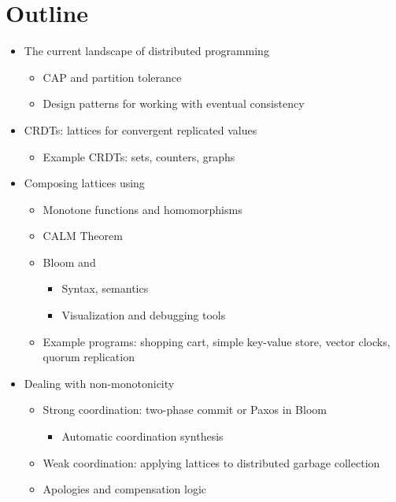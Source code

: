 \section{Outline}

\begin{itemize}
\item
  The current landscape of distributed programming
  \begin{itemize}
  \item
    CAP and partition tolerance~\cite{Brewer2012,Brewer2000}
  \item
    Design patterns for working with eventual consistency
  \end{itemize}
\item
  CRDTs: lattices for convergent replicated values
  \begin{itemize}
  \item
    Example CRDTs: sets, counters, graphs
  \end{itemize}
\item
  Composing lattices using \blooml
  \begin{itemize}
  \item
    Monotone functions and homomorphisms
  \item
    CALM Theorem
  \item
    Bloom and \blooml
    \begin{itemize}
    \item
      Syntax, semantics
    \item
      Visualization and debugging tools
    \end{itemize}
  \item
    Example programs: shopping cart, simple key-value store, vector clocks,
    quorum replication
  \end{itemize}
\item
  Dealing with non-monotonicity
  \begin{itemize}
  \item
    Strong coordination: two-phase commit or Paxos in Bloom
    \begin{itemize}
    \item
      Automatic coordination synthesis
    \end{itemize}
  \item
    Weak coordination: applying lattices to distributed garbage collection
  \item
    Apologies and compensation logic~\cite{Garcia-Molina1987,Helland2009,Korth1990}
  \end{itemize}

\end{itemize}
